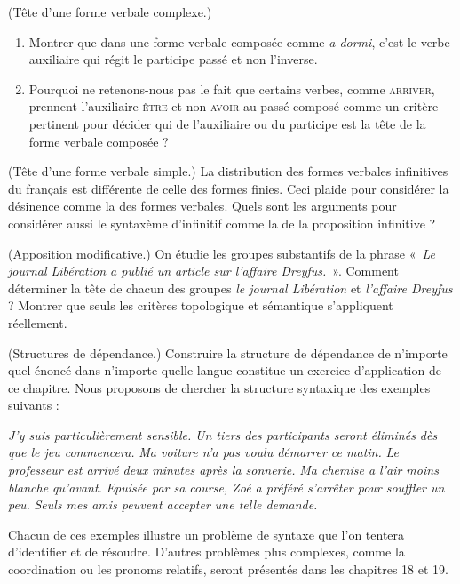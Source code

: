 {     (Tête d'une forme verbale complexe.)
    \begin{enumerate}[label=\alph*.]
    \item Montrer que dans une forme verbale composée comme \textit{a dormi}, c’est le verbe auxiliaire qui régit le participe passé et non l’inverse.
    \item Pourquoi ne retenons-nous pas le fait que certains verbes, comme \textsc{arriver}, prennent l’auxiliaire \textsc{être} et non \textsc{avoir} au passé composé comme un critère pertinent pour décider qui de l’auxiliaire ou du participe est la tête de la forme verbale composée ?
    \end{enumerate}

     (Tête d'une forme verbale simple.) La distribution des formes verbales infinitives du français est différente de celle des formes finies. Ceci plaide pour considérer la désinence comme la  des formes verbales. Quels sont les arguments pour considérer aussi le syntaxème d’infinitif comme la  de la proposition infinitive ?

     (Apposition modificative.) On étudie les groupes substantifs de la phrase «~\textit{Le journal Libération a publié un article sur l’affaire Dreyfus.}~». Comment déterminer la tête de chacun des groupes \textit{le journal Libération} et \textit{l’affaire Dreyfus} ? Montrer que seuls les critères topologique et sémantique s’appliquent réellement.

 
     (Structures de dépendance.) Construire la structure de dépendance de n’importe quel énoncé dans n’importe quelle langue constitue un exercice d’application de ce chapitre. Nous proposons de chercher la structure syntaxique des exemples suivants :

    \begin{exe}
          \textit{J’y suis particulièrement sensible.}
          \textit{Un tiers des participants seront éliminés dès que le jeu commencera.}
          \textit{Ma voiture n’a pas voulu démarrer ce matin.}
          \textit{Le professeur est arrivé deux minutes après la sonnerie.}
          \textit{Ma chemise a l’air moins blanche qu’avant.}
          \textit{Epuisée par sa course, Zoé a préféré s’arrêter pour souffler un peu.}
          \textit{Seuls mes amis peuvent accepter une telle demande.}
    \end{exe}
    Chacun de ces exemples illustre un problème de syntaxe que l’on tentera d’identifier et de résoudre. D’autres problèmes plus complexes, comme la coordination ou les pronoms relatifs, seront présentés dans les chapitres 18 et 19.%

}
